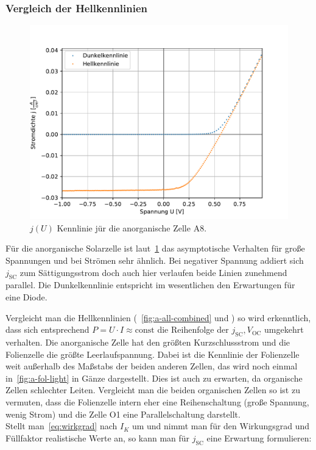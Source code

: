 \documentclass[slug=SZ, room=Hermann-Krone-Bau\,\ Labor\ 1.25, supervisor=Martin\ Kroll]{../../Lab_Report_LaTeX/lab_report}
\newcommand{\voc}{V_{\text{OC}}}
\newcommand{\jsc}{j_{\text{SC}}}
\begin{document}
\subsubsection{Vergleich der Hellkennlinien}
\label{sec:vglhell}

\begin{figure}[H]\centering
  \includegraphics[width=.7\columnwidth]{./figs/python/A/anorg_combined.pdf}
  \caption{\(j(U)\) Kennlinie j\"ur die anorganische Zelle A8.}
  \label{fig:a-anorg-combined}
\end{figure}

F\"ur die anorganische Solarzelle ist laut~\ref{fig:a-anorg-combined}
das asymptotische Verhalten f\"ur gro\ss{}e Spannungen und bei
Str\"omen sehr \"ahnlich. Bei negativer Spannung addiert sich
\(\jsc\) zum S\"attigungsstrom doch auch hier verlaufen beide Linien
zunehmend parallel. Die Dunkelkennlinie entspricht im wesentlichen
den Erwartungen f\"ur eine Diode.

Vergleicht man die Hellkennlinien (~\ref{fig:a-all-combined} und ) so wird
erkenntlich, dass sich entsprechend
\(P=U\cdot I \approx \text{const}\) die Reihenfolge der \(\jsc, \voc\)
umgekehrt verhalten. Die anorganische Zelle hat den gr\"o\ss{}ten
Kurzschlussstrom und die Folienzelle die gr\"o\ss{}te
Leerlaufspannung. Dabei ist die Kennlinie der Folienzelle weit
außerhalb des Ma\ss{}stabs der beiden anderen Zellen, das wird
noch einmal in~\ref{fig:a-fol-light} in G\"anze dargestellt.
Dies ist auch zu erwarten, da organische Zellen
schlechter Leiten. Vergleicht man die beiden organischen
Zellen so ist zu vermuten, dass die Folienzelle intern eher eine
Reihenschaltung (große Spannung, wenig Strom) und die Zelle
O1 eine Parallelschaltung darstellt.\\

Stellt man~\ref{eq:wirkgrad} nach \(I_K\) um und nimmt man für den
Wirkungsgrad und Füllfaktor realistische Werte an, so kann man für
\(\jsc\) eine Erwartung formulieren:
\end{document}
